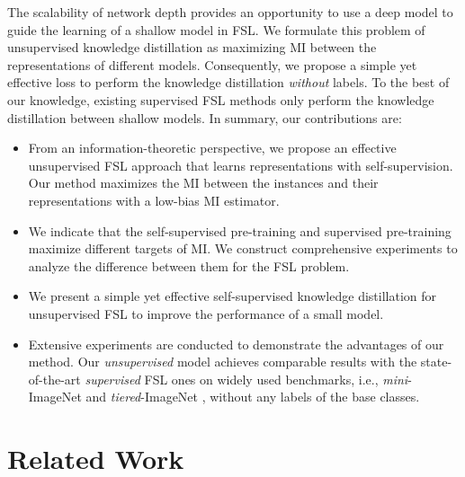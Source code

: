 \documentclass[runningheads]{llncs}
\begin{document}
The scalability of network depth provides an opportunity to use a deep model to guide the learning of a shallow model in FSL.
We formulate this problem of unsupervised knowledge distillation as maximizing MI between the representations of different models. 
Consequently, we propose a simple yet effective loss to perform the knowledge distillation \textit{without} labels.
To the best of our knowledge, existing supervised FSL methods \cite{tian2020rethinking,dvornik2019diversity} only perform the knowledge distillation between shallow models. In summary, our contributions are:
\begin{itemize}[itemsep=0pt]
\item From an information-theoretic perspective, we propose an effective unsupervised FSL approach that learns representations with self-supervision. Our method maximizes the MI between the instances and their representations with a low-bias MI estimator.
\item We indicate that the self-supervised pre-training and supervised pre-training maximize different targets of MI. We construct comprehensive experiments to analyze the difference between them for the FSL problem.
\item We present a simple yet effective self-supervised knowledge distillation for unsupervised FSL to improve the performance of a small model. 
\item Extensive experiments are conducted to demonstrate the advantages of our method. Our \textit{unsupervised} model achieves comparable results with the state-of-the-art \textit{supervised} FSL ones on widely used benchmarks, i.e., \emph{mini}-ImageNet \cite{vinyals2016matching} and \emph{tiered}-ImageNet \cite{ren2018meta}, without any labels of the base classes.
\end{itemize} 





\section{Related Work}
\end{document}
